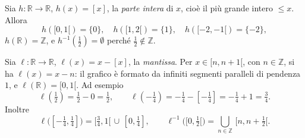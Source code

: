 \documentclass[11pt,a4paper]{article}
\begin{document}
\begin{esempio}
Sia $h : \mathbb{R} \to \mathbb{R}$, $h(x) = [x]$, la \emph{parte intera} di $x$, cioè il più grande intero $\leq x$. Allora
\[
h([0, 1[) = \{0\}, \quad h([1, 2[) = \{1\}, \quad h([-2, -1[) = \{-2\},
\]
$h(\mathbb{R}) = \mathbb{Z}$, e $h^{-1}(\tfrac12) = \emptyset$ perché $\frac12 \notin \mathbb{Z}$.
\end{esempio}

\begin{esempio}[Mantissa]
Sia $\ell : \mathbb{R} \to \mathbb{R}$, $\ell(x) = x - [x]$, la \emph{mantissa}. Per $x \in [n, n+1[$, con $n \in \mathbb{Z}$, si ha $\ell(x) = x - n$: il grafico è formato da infiniti segmenti paralleli di pendenza $1$, e $\ell(\mathbb{R}) = [0, 1[$. Ad esempio
\[
\ell(\tfrac12) = \tfrac12 - 0 = \tfrac12, \qquad
\ell(-\tfrac14) = -\tfrac14 - [-\tfrac14] = -\tfrac14 + 1 = \tfrac34.
\]
Inoltre
\[
\ell\big([-\tfrac14, \tfrac14]\big) = [\tfrac34, 1[ \,\cup\, [0, \tfrac14],
\qquad
\ell^{-1}\big([0, \tfrac12[\big) = \bigcup_{n \in \mathbb{Z}} \,[n, n + \tfrac12[.
\]
\end{esempio}
\end{document}
